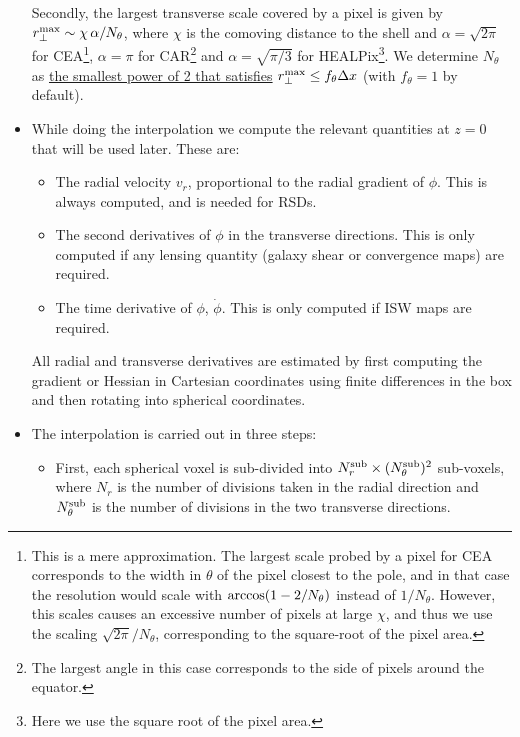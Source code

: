 \documentclass[a4paper,10pt]{article}
\begin{document}
\begin{itemize}
      Secondly, the largest transverse scale covered by a pixel is given by
      $r_\perp^{\rm max}\sim\chi\,\alpha/N_\theta$, where $\chi$ is the comoving
      distance to the shell and $\alpha=\sqrt{2\pi}$ for CEA\footnote{This is a
        mere approximation. The largest scale probed by a pixel for CEA corresponds
        to the width in $\theta$ of the pixel closest to the pole, and in that 
        case the resolution would scale with ${\rm arccos}(1-2/N_\theta)$ instead
        of $1/N_\theta$. However, this scales causes an excessive number of pixels
        at large $\chi$, and thus we use the scaling $\sqrt{2\pi}/N_\theta$,
        corresponding to the square-root of the pixel area.}, $\alpha=\pi$ for
      CAR\footnote{The largest angle in this case corresponds to the side of
        pixels around the equator.} and $\alpha=\sqrt{\pi/3}$ for
      HEALPix\footnote{Here we use the square root of the pixel area.}. We
      determine $N_\theta$ as \underline{the smallest power of 2 that satisfies}
      $r_\perp^{\rm max}\leq f_\theta\Delta x$ (with $f_\theta=1$ by default).
    \item While doing the interpolation we compute the relevant
      quantities at $z=0$ that will be used later. These are:
      \begin{itemize}
        \item The radial velocity $v_r$, proportional to the radial
          gradient of $\phi$. This is always computed, and is needed
          for RSDs.
        \item The second derivatives of $\phi$ in the transverse directions.
          This is only computed if any lensing quantity (galaxy shear or
          convergence maps) are required.
        \item The time derivative of $\phi$, $\dot{\phi}$. This is only
          computed if ISW maps are required.
      \end{itemize}
      All radial and transverse derivatives are estimated by first computing
      the gradient or Hessian in Cartesian coordinates using finite differences
      in the box and then rotating into spherical coordinates.
      
    \item The interpolation is carried out in three steps:
      \begin{itemize}
        \item First, each spherical voxel is sub-divided into 
          $N_r^{\rm sub}\times (N_\theta^{\rm sub})^2$ sub-voxels, where $N_r$ is the
          number of divisions taken in the radial direction and $N^{\rm sub}_\theta$ is
          the number of divisions in the two transverse directions.
          

\end{itemize}
\end{itemize}
\end{document}
